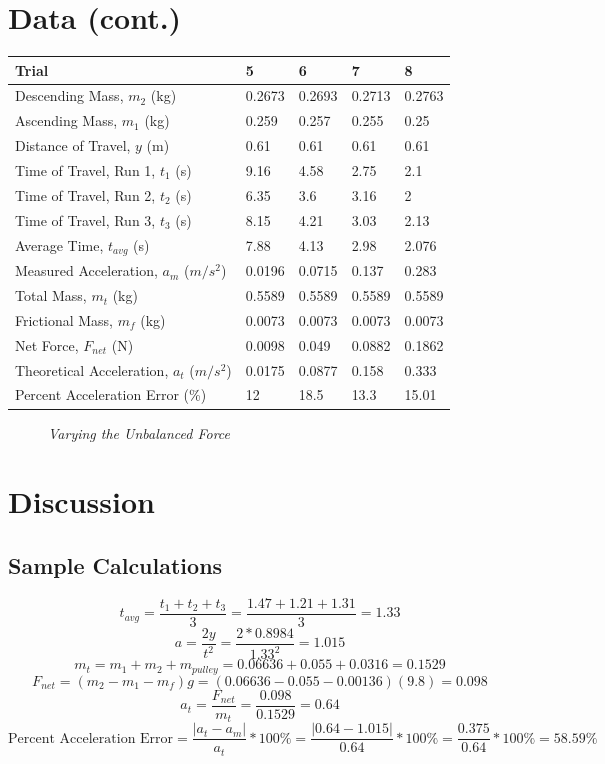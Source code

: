 \documentclass[11pt, titlepage]{article}
\begin{document}
\section*{Data (cont.)}
\begin{center}
\begin{tabular}
{|m{7em}|m{7em}|m{7em}|m{7em}|m{7em}|}
\hline
Trial & 5 & 6 & 7 & 8 \\
\hline
Descending Mass, $m_2$ (kg) & 0.2673 & 0.2693 & 0.2713& 0.2763\\
\hline
Ascending Mass, $m_1$ (kg) & 0.259 & 0.257 & 0.255 & 0.25\\
\hline
Distance of Travel, $y$ (m) & 0.61 & 0.61 & 0.61 & 0.61\\
\hline
Time of Travel, Run 1, $t_1$ (s) & 9.16& 4.58& 2.75& 2.1\\
\hline
Time of Travel, Run 2, $t_2$ (s) & 6.35& 3.6 & 3.16 & 2\\
\hline
Time of Travel, Run 3, $t_3$ (s) & 8.15& 4.21 & 3.03 & 2.13\\
\hline
Average Time, $t_{avg}$ (s) & 7.88 & 4.13 & 2.98 & 2.076 \\
\hline
Measured Acceleration, $a_m$ ($m/s^2$) & 0.0196 & 0.0715 & 0.137& 0.283\\
\hline
Total Mass, $m_t$ (kg) & 0.5589 & 0.5589 & 0.5589 & 0.5589\\
\hline
Frictional Mass, $m_f$ (kg) & 0.0073 & 0.0073 & 0.0073 & 0.0073\\
\hline
Net Force, $F_{net}$ (N) & 0.0098 & 0.049 & 0.0882 & 0.1862\\ 
\hline
Theoretical Acceleration, $a_t$ ($m/s^2$) & 0.0175 & 0.0877 & 0.158 & 0.333 \\
\hline
Percent Acceleration Error (\%) & 12 & 18.5 & 13.3 & 15.01 \\
\hline
\end{tabular}
\begin{figure}[!ht]
\caption{\emph{Varying the Unbalanced Force}}
\end{figure}
\end{center}

\pagebreak
\section*{Discussion}
\subsection*{Sample Calculations}
$$t_{avg} = \frac{t_1 + t_2 + t_3}{3} = \frac{1.47 + 1.21 + 1.31}{3} = 1.33$$
$$a = \frac{2y}{t^2} = \frac{2*0.8984}{1.33^2} = 1.015$$
$$m_t = m_1 + m_2 + m_{pulley} = 0.06636 + 0.055 + 0.0316 = 0.1529$$
$$F_{net} = (m_2 - m_1 - m_f)g = (0.06636 - 0.055 - 0.00136)(9.8) = 0.098$$
$$a_t = \frac{F_{net}}{m_t} = \frac{0.098}{0.1529} = 0.64$$
$$\text{Percent Acceleration Error} = \frac{|a_t - a_m|}{a_t}*100\% = \frac{|0.64 - 1.015|}{0.64}*100\% = \frac{0.375}{0.64}*100\% = 58.59\%$$
\end{document}
